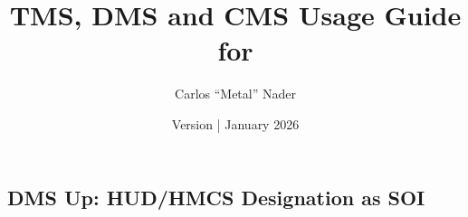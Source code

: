 \documentclass[11pt,a4paper]{article}
\title{TMS, DMS and CMS Usage Guide for \bmsver}
\author{Carlos ``Metal'' Nader}
\date{Version \fulldocversion{0.2.4.0} | January 2026}
\begin{document}
\maketitle

\newpage

\tableofcontents

\newpage







\subsection{DMS Up: HUD/HMCS Designation as SOI}

\label{sec:C4-S2-S1}

\end{document}
